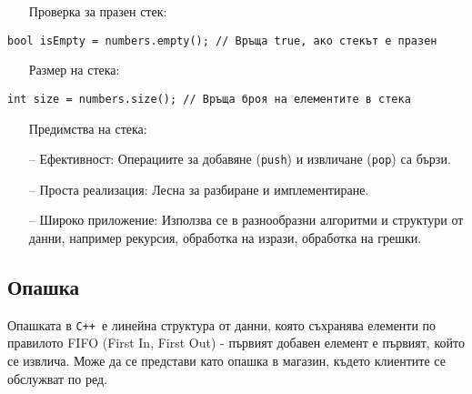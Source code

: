 \documentclass[oneside]{book}
\newcommand*{\code}[1]{\texttt{#1}}
\newcommand*{\cpp}{\texttt{C++}\ }
\begin{document}
\begin{itemize}\item[Проверка] за празен стек:\end{itemize}
\begin{mdframed}\begin{lstlisting}
bool isEmpty = numbers.empty(); // Връща true, ако стекът е празен
\end{lstlisting}\end{mdframed}

\begin{itemize}\item[Размер] на стека:\end{itemize}
\begin{mdframed}\begin{lstlisting}
int size = numbers.size(); // Връща броя на елементите в стека
\end{lstlisting}\end{mdframed}

\begin{itemize}\item[Предимства] на стека:\end{itemize}
\begin{itemize}
    \item[--] Ефективност: Операциите за добавяне (\code{push}) и извличане (\code{pop}) са бързи.
    \item[--] Проста реализация: Лесна за разбиране и имплементиране.
    \item[--] Широко приложение: Използва се в разнообразни алгоритми и структури от данни, например рекурсия, обработка на изрази, обработка на грешки.
\end{itemize}

\subsection{Опашка}
Опашката в \cpp е линейна структура от данни, която съхранява елементи по правилото FIFO (First In, First Out) - първият добавен елемент е първият, който се извлича. Може да се представи като опашка в магазин, където клиентите се обслужват по ред.
\end{document}
